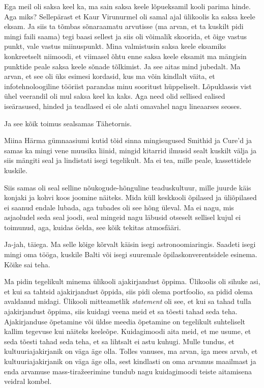 Ega meil oli saksa keel ka, ma sain saksa keele lõpueksamil kooli parima hinde. 
Aga miks? Sellepärast et Kaur Virunurmel oli samal 
ajal ülikoolis ka saksa keele eksam. Ja siis ta tõmbas sõnaraamatu arvutisse 
(ma arvan, et ta kuskilt pidi mingi faili saama) tegi baasi sellest ja siis oli 
võimalik skoorida, et õige vastus punkt, vale vastus miinuspunkt. Mina  
valmistusin saksa keele eksamiks konkreetselt niimoodi, et viimasel õhtu enne 
saksa keele eksamit ma mängisin punktide peale saksa keele sõnade tõlkimist. Ja 
see aitas mind  jubedalt. Ma arvan, et see oli üks esimesi kordasid, kus ma 
võin kindlalt väita, et infotehnoloogiline tööriist parandas minu sooritust 
hüppeliselt. Lõpuklassis vist ühel veerandil oli mul saksa keel ka kaks. Aga 
need olid sellised ealised iseärasused, hinded ja teadlased ei ole alati 
omavahel nagu lineaarses seoses.

Ja see kõik toimus sealsamas Tähetornis.

Miina Härma gümnaasiumi kutid tõid sinna mingisugused Smithid ja Cure'd ja 
samas ka mingi vene muusika liinid, mingid kitarrid ilmusid sealt kuskilt välja 
ja siis mängiti seal ja lindistati isegi tegelikult. Ma ei tea, mille peale, 
kassettidele kuskile. 

Siis samas oli seal selline  nõukogude-hõnguline teaduskultuur, mille juurde 
käis konjaki ja kohvi koos joomine näiteks. Mida küll  keskkooli õpilased ja 
üliõpilased ei saanud endale lubada, aga tubades  oli see hõng  üleval. Ma ei 
nagu, mis asjaoludel seda seal joodi, seal mingeid nagu läbusid otseselt 
sellisel kujul ei toimunud, aga, kuidas öelda, see kõik tekitas atmosfääri.


Ja-jah, täiega. Ma selle kõige kõrvalt käisin isegi astronoomiaringis. Saadeti 
isegi mingi oma tööga, kuskile Balti või  isegi suuremale  
õpilaskonverentsidele esinema. Kõike sai teha.


Ma pidin tegelikult minema ülikooli ajakirjandust õppima. Ülikoolis oli sihuke 
asi, et kui sa tahtsid ajakirjandust õppida, siis pidi olema portfoolio, sa 
pidid olema avaldanud midagi. Ülikooli mitteametlik \emph{statement} oli see, 
et kui sa tahad tulla ajakirjandust õppima, siis kuidagi veena meid et sa 
tõesti tahad seda teha. Ajakirjanduse õpetamine või üldse meedia õpetamine on 
tegelikult suhteliselt kallim tegevuse kui näiteks keeleõpe. Kuidagimoodi aita 
meid, et me usume, et seda tõesti tahad seda teha, et sa lihtsalt ei  astu 
kuhugi. Mulle tundus, et kultuuriajakirjanik on väga äge olla. Tolles vanuses, 
ma arvan, iga mees arvab, et  kultuuriajakirjanik on väga äge olla, sest 
kindlasti on oma arvamus maailmast ja enda arvamuse mass-tiražeerimine  tundub 
nagu kuidagimoodi teiste aitamisena veidral kombel.

